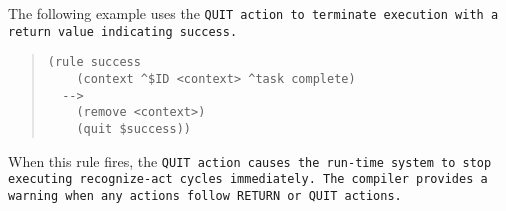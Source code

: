 The following example uses the \tt{QUIT} action to terminate execution
with a return value indicating success.

\begin{quote}
\begin{verbatim}
(rule success
    (context ^$ID <context> ^task complete)
  -->
    (remove <context>)
    (quit $success))
\end{verbatim}
\end{quote}


When this rule fires, the \tt{QUIT} action causes the run-time system
to stop executing recognize-act cycles immediately. The compiler
provides a warning when any actions follow \tt{RETURN} or \tt{QUIT}
actions.

